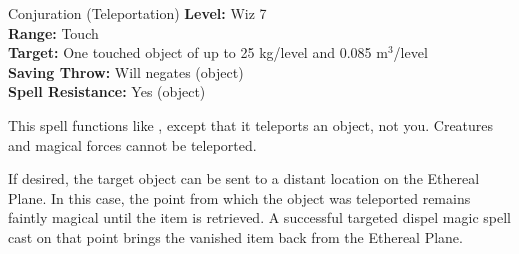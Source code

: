 {Conjuration (Teleportation)}
{
	\textbf{Level:}
	Wiz 7\\
	\textbf{Range:}
	Touch\\
	\textbf{Target:}
	One touched object of up to 25 kg/level and 0.085 m$^3$/level\\
	\textbf{Saving Throw:}
	Will negates (object)\\
	\textbf{Spell Resistance:}
	Yes (object)\\
}
{
	This spell functions like , except that it teleports an object, not you. Creatures and magical forces cannot be teleported.

	If desired, the target object can be sent to a distant location on the Ethereal Plane. In this case, the point from which the object was teleported remains faintly magical until the item is retrieved. A successful targeted dispel magic spell cast on that point brings the vanished item back from the Ethereal Plane.

}
